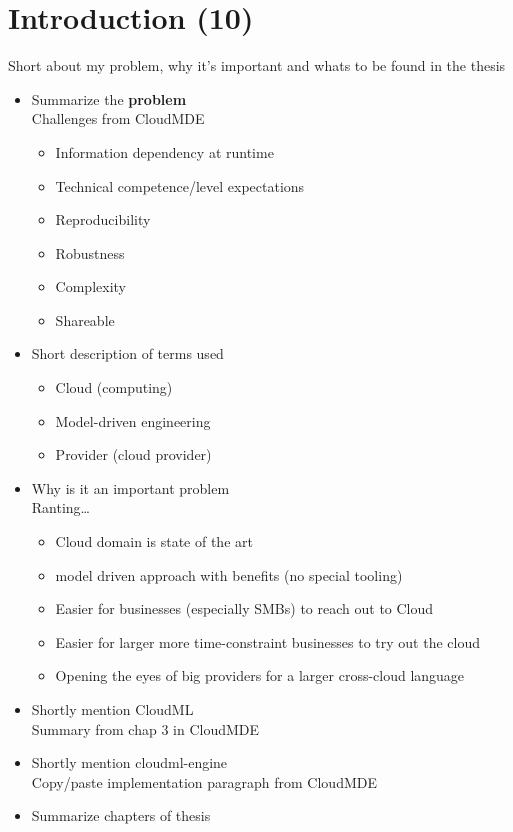\section{Introduction (10)}

Short about my problem, why it's important and whats to be found in the thesis 

\begin{itemize}
  \item Summarize the \textbf{problem} \\
      Challenges from CloudMDE
    \begin{itemize}
      \item Information dependency at runtime
      \item Technical competence/level expectations
      \item Reproducibility
      \item Robustness
      \item Complexity
      \item Shareable
    \end{itemize}
  \item Short description of terms used
    \begin{itemize}
      \item Cloud (computing)
      \item Model-driven engineering
      \item Provider (cloud provider)
    \end{itemize}
  \item Why is it an important problem \\
      Ranting\ldots
    \begin{itemize}
      \item Cloud domain is state of the art
      \item model driven approach with benefits (no special tooling)
      \item Easier for businesses (especially SMBs) to reach out to Cloud
      \item Easier for larger more time-constraint businesses to try out the cloud
      \item Opening the eyes of big providers for a larger cross-cloud language
    \end{itemize}
  \item Shortly mention CloudML \\
      Summary from chap 3 in CloudMDE
  \item Shortly mention cloudml-engine \\
      Copy/paste implementation paragraph from CloudMDE
  \item Summarize chapters of thesis
\end{itemize}
